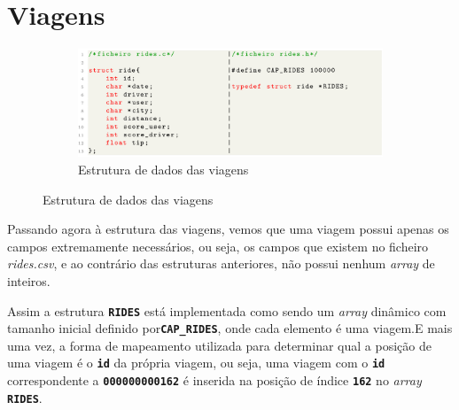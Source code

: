 \documentclass[12pt,a4paper]{report}
\begin{document}
\pagebreak
\section{Viagens}

\begin{figure}[hbt!]
    \centering
    \begin{subfigure}{\textwidth}
        \centering
        \includegraphics[width=1\linewidth]{images/rides.png}
        \caption*{Estrutura de dados das viagens}
        \label{fig:rides}
    \end{subfigure}
\end{figure}

Passando agora à estrutura das viagens, vemos que uma viagem possui apenas os campos extremamente necessários, ou seja, os campos que existem no ficheiro \textit{rides.csv}, e ao contrário das estruturas anteriores, não possui nenhum \textit{array} de inteiros.

Assim a estrutura \textbf{\small\texttt{RIDES}} está implementada como sendo um \textit{array} dinâmico com tamanho inicial definido por\textbf{\small\texttt{CAP\_RIDES}}, onde cada elemento é uma viagem.E mais uma vez, a forma de mapeamento utilizada para determinar qual a posição de uma viagem é o \textbf{\small\texttt{id}} da própria viagem, ou seja, uma viagem com o \textbf{\small\texttt{id}} correspondente a \textbf{\small\texttt{000000000162}} é inserida na posição de índice \textbf{\small\texttt{162}} no \textit{array} \textbf{\small\texttt{RIDES}}.
\end{document}
